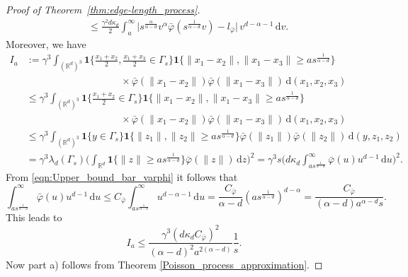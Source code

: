 \documentclass{article}
\theoremstyle{definition}
\numberwithin{equation}{section}
\theoremstyle{remark}
\begin{document}
\begin{proof}[Proof of Theorem~\ref{thm:edge-length_process}]
\begin{align*}
& \leq \frac{\gamma^2 d \kappa_d }{2}\int_a^\infty \big|s^{\frac{\alpha}{\alpha-d}}v^{\alpha} \bar{\varphi}(s^{\frac{1}{\alpha-d}}v) -l_{\bar{\varphi}}\big| \, v^{d-\alpha-1}\, \mathrm{d}v.
\end{align*}
Moreover, we have
\begin{align*}
I_a & := \gamma^3 \int_{(\mathbb{R}^d)^3} \mathbf{1}\bigg\{ \frac{x_1+x_2}{2}, \frac{x_1+x_3}{2} \in \Gamma_s \bigg\} \mathbf{1}\{ \|x_1-x_2\|, \|x_1-x_3\| \geq a s^{\frac{1}{\alpha-d}}\} \\
& \hspace{4cm} \times \bar{\varphi}(\|x_1-x_2\|) \bar{\varphi}(\|x_1-x_3\|) \, \mathrm{d}(x_1,x_2,x_3) \\
& \le \gamma^3 \int_{(\mathbb{R}^d)^3} \mathbf{1}\bigg\{ \frac{x_1+x_2}{2} \in \Gamma_s \bigg\} \mathbf{1}\{ \|x_1-x_2\|, \|x_1-x_3\| \geq a s^{\frac{1}{\alpha-d}}\} \\
& \hspace{4cm} \times \bar{\varphi}(\|x_1-x_2\|) \bar{\varphi}(\|x_1-x_3\|) \, \mathrm{d}(x_1,x_2,x_3) \\
& \le \gamma^3 \int_{(\mathbb{R}^d)^3} \mathbf{1}\{ y \in \Gamma_s \} \mathbf{1}\{ \|z_1\|, \|z_2\| \geq a s^{\frac{1}{\alpha-d}}\} \bar{\varphi}(\|z_1\|) \bar{\varphi}(\|z_2\|) \, \mathrm{d}(y,z_1,z_2) \\
& = \gamma^3 \lambda_d(\Gamma_s) \bigg( \int_{\mathbb{R}^d} \mathbf{1}\{\|z\|\geq a s^{\frac{1}{\alpha-d}}\} \bar{\varphi}(\|z\|) \, \mathrm{d}z \bigg)^2 = \gamma^3 s \bigg( d\kappa_d \int_{a s^{\frac{1}{\alpha-d}}}^\infty \bar{\varphi}(u) u^{d-1}\, \mathrm{d}u \bigg)^2.
\end{align*}
From \eqref{eqn:Upper_bound_bar_varphi} it follows that
$$
\int_{a s^{\frac{1}{\alpha-d}}}^\infty \bar{\varphi}(u) u^{d-1} \, \mathrm{d}u \leq C_{\bar{\varphi}} \int_{a s^{\frac{1}{\alpha-d}}}^\infty u^{d-\alpha-1} \, \mathrm{d}u = \frac{C_{\bar{\varphi}}}{\alpha-d} (a s^{\frac{1}{\alpha-d}})^{d-\alpha} = \frac{C_{\bar{\varphi}}}{(\alpha-d) a^{\alpha-d} s}.
$$
This leads to
$$
I_a \leq \frac{\gamma^3 (d\kappa_d C_{\bar{\varphi}})^2}{(\alpha-d)^2 a^{2(\alpha-d)}} \frac{1}{s}.
$$
Now part a) follows from Theorem \ref{Poisson_process_approximation}.


\end{proof}
\end{document}
